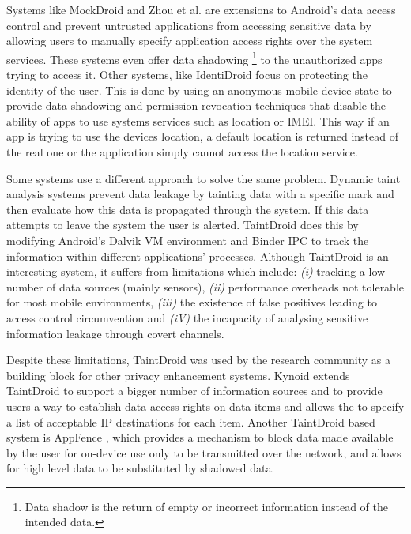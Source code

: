 Systems like MockDroid \cite{beresford2011mockdroid} and Zhou et al. \cite{zhou2011taming} are extensions to Android's data access control and prevent untrusted applications from accessing sensitive data by allowing users to manually specify application access rights over the system services. These systems even offer data shadowing \footnote{Data shadow is the return of empty or incorrect information instead of the intended data.} to the unauthorized apps trying to access it. Other systems, like IdentiDroid \cite{shebaro2014identidroid} focus on protecting the identity of the user. This is done by using an anonymous mobile device state to provide data shadowing and permission revocation techniques that disable the ability of apps to use systems services such as location or \ac{IMEI}. This way if an app is trying to use the devices location, a default location is returned instead of the real one or the application simply cannot access the location service.

Some systems use a different approach to solve the same problem. Dynamic taint analysis systems prevent data leakage by tainting data with a specific mark and then evaluate how this data is propagated through the system. If this data attempts to leave the system the user is alerted. TaintDroid \cite{enck2014taintdroid} does this by modifying Android's Dalvik VM environment and Binder \ac{IPC} to track the information within different applications' processes. Although TaintDroid is an interesting system, it suffers from limitations which include: \emph{(i)} tracking a low number of data sources (mainly sensors), \emph{(ii)} performance overheads not tolerable for most mobile environments, \emph{(iii)} the existence of false positives leading to access control circumvention and \emph{(iV)} the incapacity of analysing sensitive information leakage through covert channels.

Despite these limitations, TaintDroid was used by the research community as a building block for other privacy enhancement systems. Kynoid \cite{schreckling2013kynoid} extends TaintDroid to support a bigger number of information sources and to provide users a way to establish data access rights on data items and allows the to specify a list of acceptable IP destinations for each item. Another TaintDroid based system is AppFence \cite{hornyack2011these}, which provides a mechanism to block data made available by the user for on-device use only to be transmitted over the network, and allows for high level data to be substituted by shadowed data.


